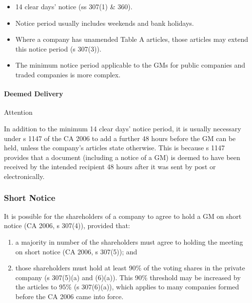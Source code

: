 \documentclass[
]{article}
\providecommand{\tightlist}{%
  \setlength{\itemsep}{0pt}\setlength{\parskip}{0pt}}
\newenvironment{env-0cbdd535-e651-4c17-8f3a-ff3377c34628}
{
    \savenotes\tcolorbox[blanker,breakable,left=5pt,borderline west={2pt}{-4pt}{gray}]
}
{
    \endtcolorbox\spewnotes
}
\begin{document}
\begin{itemize}
\tightlist
\item
  14 clear days' notice (ss 307(1) \& 360).
\item
  Notice period usually includes weekends and bank holidays.
\item
  Where a company has unamended Table A articles, those articles may
  extend this notice period (s 307(3)).
\item
  The minimum notice period applicable to the GMs for public companies
  and traded companies is more complex.
\end{itemize}

\hypertarget{deemed-delivery}{%
\paragraph{Deemed Delivery}\label{deemed-delivery}}

\begin{env-0cbdd535-e651-4c17-8f3a-ff3377c34628}

Attention

In addition to the minimum 14 clear days' notice period, it is usually
necessary under s 1147 of the CA 2006 to add a further 48 hours before
the GM can be held, unless the company's articles state otherwise. This
is because s 1147 provides that a document (including a notice of a GM)
is deemed to have been received by the intended recipient 48 hours after
it was sent by post or electronically.

\end{env-0cbdd535-e651-4c17-8f3a-ff3377c34628}

\hypertarget{short-notice}{%
\subsubsection{Short Notice}\label{short-notice}}

It is possible for the shareholders of a company to agree to hold a GM
on short notice (CA 2006, s 307(4)), provided that:

\begin{enumerate}
\tightlist
\item
  a majority in number of the shareholders must agree to holding the
  meeting on short notice (CA 2006, s 307(5)); and
\item
  those shareholders must hold at least 90\% of the voting shares in the
  private company (s 307(5)(a) and (6)(a)). This 90\% threshold may be
  increased by the articles to 95\% (s 307(6)(a)), which applies to many
  companies formed before the CA 2006 came into force.
\end{enumerate}
\end{document}
